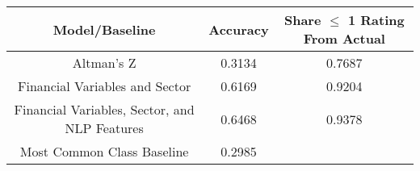 \footnotesize
\begin{tabular}{ccc}
\toprule
Model/Baseline & Accuracy & Share $\le$ 1 Rating From Actual \\
\midrule
Altman's Z & 0.3134 & 0.7687 \\
Financial Variables and Sector & 0.6169 & 0.9204 \\
Financial Variables, Sector, and NLP Features & 0.6468 & 0.9378 \\
Most Common Class Baseline & 0.2985 &  \\
\bottomrule
\end{tabular}

\normalsize